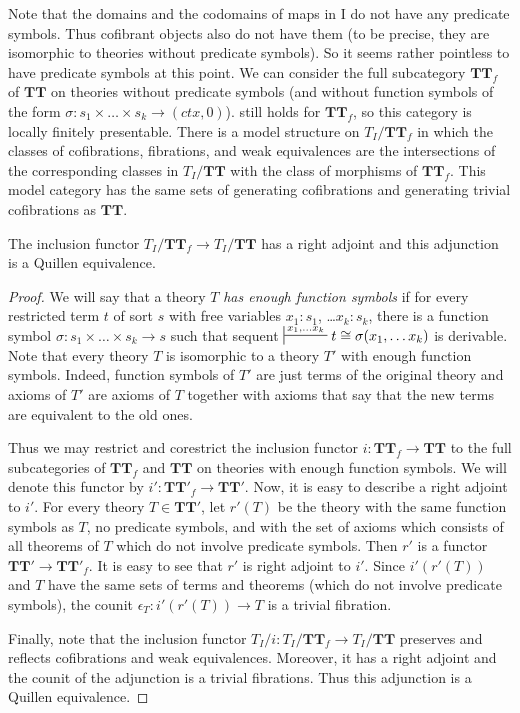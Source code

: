 \documentclass[reqno]{amsart}
\theoremstyle{definition}
\theoremstyle{remark}
\newcommand{\cat}[1]{\mathbf{#1}}
\newcommand{\algtt}{\cat{TT}}
\newcommand{\ctx}{\mathit{ctx}}
\newcommand{\I}{\mathrm{I}}
\numberwithin{figure}{section}
\begin{document}
Note that the domains and the codomains of maps in $\I$ do not have any predicate symbols.
Thus cofibrant objects also do not have them (to be precise, they are isomorphic to theories without predicate symbols).
So it seems rather pointless to have predicate symbols at this point.
We can consider the full subcategory $\algtt_f$ of $\algtt$ on theories without predicate symbols
(and without function symbols of the form $\sigma : s_1 \times \ldots \times s_k \to (\ctx,0)$).
 still holds for $\algtt_f$, so this category is locally finitely presentable.
There is a model structure on $T_I/\algtt_f$ in which the classes of cofibrations, fibrations, and weak equivalences
are the intersections of the corresponding classes in $T_I/\algtt$ with the class of morphisms of $\algtt_f$.
This model category has the same sets of generating cofibrations and generating trivial cofibrations as $\algtt$.

\begin{prop}
The inclusion functor $T_I/\algtt_f \to T_I/\algtt$ has a right adjoint and this adjunction is a Quillen equivalence.
\end{prop}
\begin{proof}
We will say that a theory $T$ \emph{has enough function symbols} if for every restricted term $t$ of sort $s$ with free variables $x_1 : s_1$, \ldots $x_k : s_k$,
there is a function symbol $\sigma : s_1 \times \ldots \times s_k \to s$ such that sequent $\sststile{}{x_1, \ldots x_k} t \cong \sigma(x_1, \ldots x_k)$ is derivable.
Note that every theory $T$ is isomorphic to a theory $T'$ with enough function symbols.
Indeed, function symbols of $T'$ are just terms of the original theory and
axioms of $T'$ are axioms of $T$ together with axioms that say that the new terms are equivalent to the old ones.

Thus we may restrict and corestrict the inclusion functor $i : \algtt_f \to \algtt$ to the full subcategories of $\algtt_f$ and $\algtt$ on theories with enough function symbols.
We will denote this functor by $i' : \algtt'_f \to \algtt'$.
Now, it is easy to describe a right adjoint to $i'$.
For every theory $T \in \algtt'$, let $r'(T)$ be the theory with the same function symbols as $T$, no predicate symbols,
and with the set of axioms which consists of all theorems of $T$ which do not involve predicate symbols.
Then $r'$ is a functor $\algtt' \to \algtt'_f$.
It is easy to see that $r'$ is right adjoint to $i'$.
Since $i'(r'(T))$ and $T$ have the same sets of terms and theorems (which do not involve predicate symbols), the counit $\epsilon_T : i'(r'(T)) \to T$ is a trivial fibration.

Finally, note that the inclusion functor $T_I/i : T_I/\algtt_f \to T_I/\algtt$ preserves and reflects cofibrations and weak equivalences.
Moreover, it has a right adjoint and the counit of the adjunction is a trivial fibrations.
Thus this adjunction is a Quillen equivalence.
\end{proof}
\end{document}
